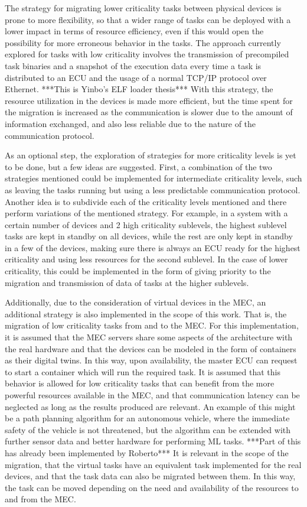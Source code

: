 The strategy for migrating lower criticality tasks between physical devices is prone to more flexibility, so that a wider range of tasks can be deployed with a lower impact in terms of resource efficiency, even if this would open the possibility for more erroneous behavior in the tasks. The approach currently explored for tasks with low criticality involves the transmission of precompiled task binaries and a snapshot of the execution data every time a task is distributed to an ECU and the usage of a normal TCP/IP protocol over Ethernet. ***This is Yinbo's ELF loader thesis*** With this strategy, the resource utilization in the devices is made more efficient, but the time spent for the migration is increased as the communication is slower due to the amount of information exchanged, and also less reliable due to the nature of the communication protocol. 

As an optional step, the exploration of strategies for more criticality levels is yet to be done, but a few ideas are suggested. First, a combination of the two strategies mentioned could be implemented for intermediate criticality levels, such as leaving the tasks running but using a less predictable communication protocol. Another idea is to subdivide each of the criticality levels mentioned and there perform variations of the mentioned strategy. For example, in a system with a certain number of devices and 2 high criticality sublevels, the highest sublevel tasks are kept in standby on all devices, while the rest are only kept in standby in a few of the devices, making sure there is always an ECU ready for the highest criticality and using less resources for the second sublevel. In the case of lower criticality, this could be implemented in the form of giving priority to the migration and transmission of data of tasks at the higher sublevels.

Additionally, due to the consideration of virtual devices in the MEC, an additional strategy is also implemented in the scope of this work. That is, the migration of low criticality tasks from and to the MEC. For this implementation, it is assumed that the MEC servers share some aspects of the architecture with the real hardware and that the devices can be modeled in the form of containers as their digital twins. In this way, upon availability, the master ECU can request to start a container which will run the required task. It is assumed that this behavior is allowed for low criticality tasks that can benefit from the more powerful resources available in the MEC, and that communication latency can be neglected as long as the results produced are relevant. An example of this might be a path planning algorithm for an autonomous vehicle, where the immediate safety of the vehicle is not threatened, but the algorithm can be extended with further sensor data and better hardware for performing ML tasks. ***Part of this has already been implemented by Roberto*** It is relevant in the scope of the migration, that the virtual tasks have an equivalent task implemented for the real devices, and that the task data can also be migrated between them. In this way, the task can be moved depending on the need and availability of the resources to and from the MEC.



	

